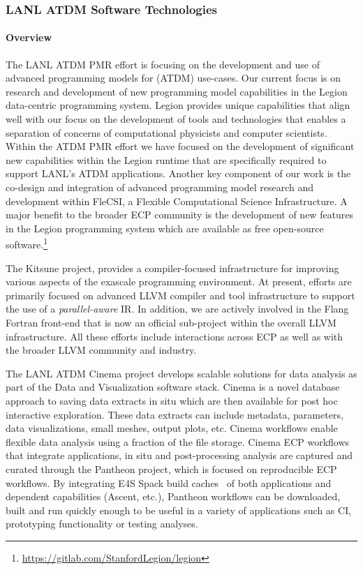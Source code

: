 \subsubsection{ LANL ATDM Software Technologies}

\paragraph{Overview} %

The LANL ATDM PMR effort is focusing on the development and use of
advanced programming models for (ATDM) use-cases. Our current focus is on research and development
of new programming model capabilities in the Legion data-centric
programming system. Legion provides unique capabilities that align
well with our focus on the development of tools and technologies that
enables a separation of concerns of computational physicists and
computer scientists. Within the ATDM PMR effort we have focused on the
development of significant new capabilities within the Legion runtime
that are specifically required to support LANL's ATDM
applications. Another key component of our work is the co-design and
integration of advanced programming model research and development
within FleCSI, a Flexible Computational Science Infrastructure. A
major benefit to the broader ECP community is the development of new 
features in the Legion programming system which are available as free
open-source software.\footnote{\url{https://gitlab.com/StanfordLegion/legion}}

The Kitsune project, provides a compiler-focused infrastructure
for improving various aspects of the exascale programming environment.
At present, efforts are primarily focused on advanced LLVM compiler and
tool infrastructure to support the use of a \emph{parallel-aware} IR.
In addition, we are actively involved in the Flang Fortran
front-end that is now an official sub-project within the overall LLVM
infrastructure. All these efforts include interactions across ECP as well as
with the broader LLVM community and industry.  


The LANL ATDM Cinema project develops scalable solutions for data analysis as part of the Data and Visualization software stack.
Cinema is a novel database approach to saving data extracts in situ which are then available for post hoc interactive exploration.  These data extracts can include metadata, parameters, data visualizations, small meshes, output plots, etc.  Cinema workflows enable flexible data analysis using a fraction of the file storage.  Cinema ECP workflows that integrate applications, in situ and post-processing analysis are captured and curated through the Pantheon project, which is focused on reproducible ECP workflows.  By integrating E4S Spack build caches~\cite{e4s:builds} of both applications and dependent capabilities (Ascent, etc.), Pantheon workflows can be downloaded, built and run quickly enough to be useful in a variety of applications such as CI, prototyping functionality or testing analyses.  

